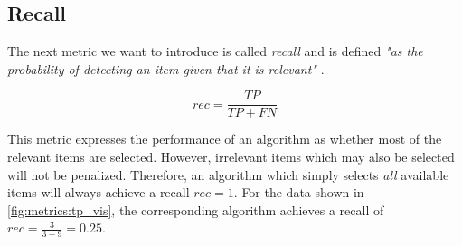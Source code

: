 \subsection{Recall}
\label{chp:fundamentals:sec:metrics:subsec:Recall}

The next metric we want to introduce is called \textit{recall} and is defined \textit{"as the probability of detecting an item given that it is relevant"} \parencite{Zhu:2004}.

\begin{equation}\label{eq:recall}
    rec = \frac{TP}{TP+FN}
\end{equation}

This metric expresses the performance of an algorithm as whether most of the relevant items are selected.
However, irrelevant items which may also be selected will not be penalized.
Therefore, an algorithm which simply selects \textit{all} available items will always achieve a recall $rec=1$.
For the data shown in \cref{fig:metrics:tp_vis}, the corresponding algorithm achieves a recall of $rec = \frac{3}{3+9} = 0.25$.
